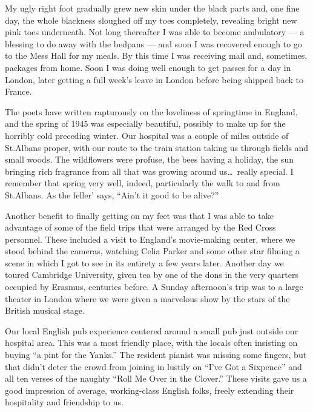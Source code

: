 \documentclass[../m3y]{subfiles}
\begin{document}
My ugly right foot gradually grew new skin under the black parts and, one fine day, the whole blackness sloughed off my toes completely, revealing bright new pink toes underneath. Not long thereafter I was able to become ambulatory --- a blessing to do away with the bedpans --- and soon I was recovered enough to go to the Mess Hall for my meals. By this time I was receiving mail and, sometimes, packages from home. Soon I was doing well enough to get passes for a day in London, later getting a full week's leave in London before being shipped back to France.

The poets have written rapturously on the loveliness of springtime in England, and the spring of 1945 was especially beautiful, possibly to make up for the horribly cold preceding winter. Our hospital was a couple of miles outside of St.\@ Albans proper, with our route to the train station taking us through fields and small woods. The wildflowers were profuse, the bees having a holiday, the sun bringing rich fragrance from all that was growing around us\ldots\ really special. I remember that spring very well, indeed, particularly the walk to and from St.\@ Albans. As the feller' says, ``Ain't it good to be alive?''

Another benefit to finally getting on my feet was that I was able to take advantage of some of the field trips that were arranged by the Red Cross personnel. These included a visit to England's movie-making center, where we stood behind the cameras, watching Celia Parker and some other star filming a scene in which I got to see in its entirety a few years later. Another day we toured Cambridge University, given tea by one of the dons in the very quarters occupied by Erasmus, centuries before. A Sunday afternoon's trip was to a large theater in London where we were given a marvelous show by the stars of the British musical stage.

Our local English pub experience centered around a small pub just outside our hospital area. This was a most friendly place, with the locals often insisting on buying ``a pint for the Yanks.'' The resident pianist was missing some fingers, but that didn't deter the crowd from joining in lustily on ``I've Got a Sixpence'' and all ten verses of the naughty ``Roll Me Over in the Clover.'' These visits gave us a good impression of average, working-class English folks, freely extending their hospitality and friendship to us.
\end{document}

